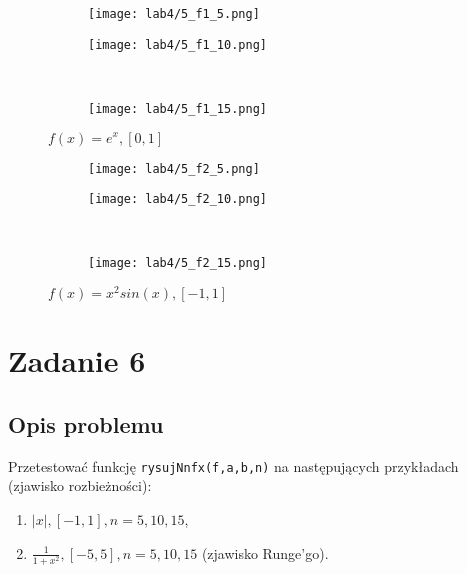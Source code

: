 \documentclass[a4paper]{article}
\begin{document}
    \begin{figure}[H]
     \centering
     \begin{subfigure}[b]{0.5\textwidth}
         \centering
         \texttt{[image: lab4/5\_f1\_5.png]}
     \end{subfigure}
     \hfill
     \begin{subfigure}[b]{0.5\textwidth}
         \centering
         \texttt{[image: lab4/5\_f1\_10.png]}
     \end{subfigure}
     \hfill
     \\
     \begin{subfigure}[b]{0.5\textwidth}
         \centering
         \texttt{[image: lab4/5\_f1\_15.png]}
     \end{subfigure}
        \caption{$f(x) = e^x, [0, 1]$}
    \end{figure}


    \begin{figure}[H]
     \centering
     \begin{subfigure}[b]{0.5\textwidth}
         \centering
         \texttt{[image: lab4/5\_f2\_5.png]}
     \end{subfigure}
     \hfill
     \begin{subfigure}[b]{0.5\textwidth}
         \centering
         \texttt{[image: lab4/5\_f2\_10.png]}
     \end{subfigure}
     \hfill
     \\
     \begin{subfigure}[b]{0.5\textwidth}
         \centering
         \texttt{[image: lab4/5\_f2\_15.png]}
     \end{subfigure}
        \caption{$f(x) = x^2sin(x), [-1, 1]$}
    \end{figure}
    
\section{Zadanie 6}
    \subsection{Opis problemu}
    Przetestować funkcję \texttt{rysujNnfx(f,a,b,n)} na następujących przykładach (zjawisko rozbieżności):
    \begin{enumerate}
        \item $|x|, [-1, 1] , n = 5, 10, 15$,
        \item $\frac{1}{1+x^2} , [-5, 5] , n = 5, 10, 15$ (zjawisko Runge’go).
    \end{enumerate}
    
\end{document}
